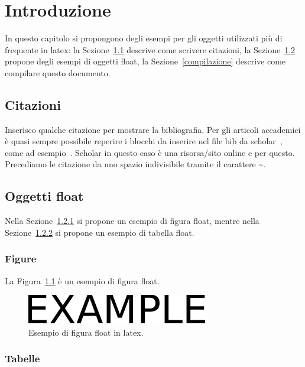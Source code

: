 \chapter{Introduzione}
\label{introduzione}

In questo capitolo si propongono degli esempi per gli oggetti utilizzati più di frequente in latex: la Sezione~\ref{citazioni} descrive come scrivere citazioni, la Sezione~\ref{oggetti-float} propone degli esempi di oggetti float, la Sezione~\ref{compilazione} descrive come compilare questo documento.

\section{Citazioni}
\label{citazioni}

Inserisco qualche citazione per mostrare la bibliografia. Per gli articoli accademici è quasi sempre possibile reperire i blocchi da inserire nel file bib da scholar~\cite{google:scholar}, come ad esempio~\cite{feige:zero}. Scholar in questo caso è una risorsa/sito online e per questo. Precediamo le citazione da uno spazio indivisibile tramite il carattere \textasciitilde.

\section{Oggetti float}
\label{oggetti-float}

Nella Sezione~\ref{figure-float} si propone un esempio di figura float, mentre nella Sezione~\ref{tabelle-float} si propone un esempio di tabella float.

\subsection{Figure}
\label{figure-float}

La Figura~\ref{fig:esempio} è un esempio di figura float.

\begin{figure}[htb]
    \centering
    \includegraphics[width=.4\columnwidth]{figures/example.pdf}
    \caption{Esempio di figura float in latex.}
\label{fig:esempio}
\end{figure}

\subsection{Tabelle}
\label{tabelle-float}

